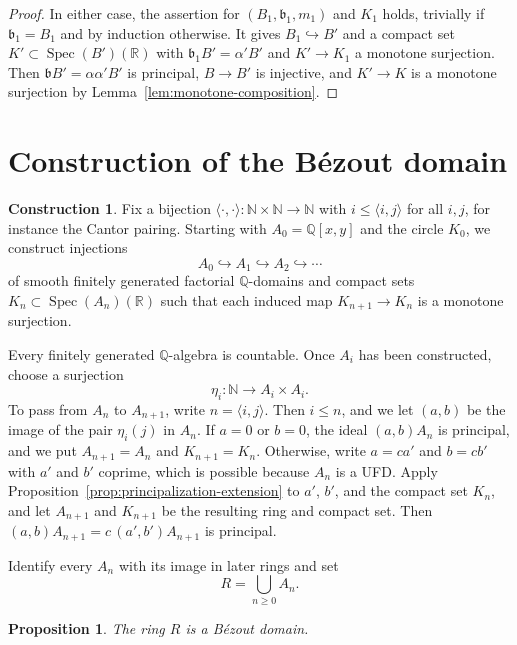 \documentclass[11pt]{amsart}
\numberwithin{equation}{section}
\newtheorem{proposition}[theorem]{Proposition}
\theoremstyle{definition}
\newtheorem{construction}[theorem]{Construction}
\newcommand{\Q}{\mathbb{Q}}
\newcommand{\R}{\mathbb{R}}
\newcommand{\N}{\mathbb{N}}
\newcommand{\fb}{\mathfrak{b}}
\DeclareMathOperator{\Spec}{Spec}
\begin{document}
\begin{proof}
In either case, the assertion for $(B_1,\fb_1,m_1)$ and $K_1$ holds, trivially if $\fb_1=B_1$ and by induction otherwise. It gives $B_1\hookrightarrow B'$ and a compact set $K'\subset\Spec(B')(\R)$ with $\fb_1B'=\alpha'B'$ and $K'\to K_1$ a monotone surjection. Then $\fb B'=\alpha\alpha'B'$ is principal, $B\to B'$ is injective, and $K'\to K$ is a monotone surjection by Lemma~\ref{lem:monotone-composition}.
\end{proof}


\section{Construction of the B\'ezout domain}\label{sec:construction}

\begin{construction}\label{construction:ring}
Fix a bijection $\langle\cdot,\cdot\rangle:\N\times\N\to\N$ with $i\le\langle i,j\rangle$ for all $i,j$, for instance the Cantor pairing. Starting with $A_0=\Q[x,y]$ and the circle $K_0$, we construct injections
\[
  A_0\hookrightarrow A_1\hookrightarrow A_2\hookrightarrow\cdots
\]
of smooth finitely generated factorial $\Q$-domains and compact sets $K_n\subset\Spec(A_n)(\R)$ such that each induced map $K_{n+1}\to K_n$ is a monotone surjection.

Every finitely generated $\Q$-algebra is countable. Once $A_i$ has been constructed, choose a surjection
\[
  \eta_i:\N\longrightarrow A_i\times A_i.
\]
To pass from $A_n$ to $A_{n+1}$, write $n=\langle i,j\rangle$. Then $i\le n$, and we let $(a,b)$ be the image of the pair $\eta_i(j)$ in $A_n$. If $a=0$ or $b=0$, the ideal $(a,b)A_n$ is principal, and we put $A_{n+1}=A_n$ and $K_{n+1}=K_n$. Otherwise, write $a=ca'$ and $b=cb'$ with $a'$ and $b'$ coprime, which is possible because $A_n$ is a UFD. Apply Proposition~\ref{prop:principalization-extension} to $a'$, $b'$, and the compact set $K_n$, and let $A_{n+1}$ and $K_{n+1}$ be the resulting ring and compact set. Then $(a,b)A_{n+1}=c\,(a',b')A_{n+1}$ is principal.

Identify every $A_n$ with its image in later rings and set
\begin{equation}\label{eq:union-ring}
  R=\bigcup_{n\ge0}A_n.
\end{equation}
\end{construction}

\begin{proposition}\label{prop:bezout-domain}
The ring $R$ is a B\'ezout domain.
\end{proposition}
\end{document}
